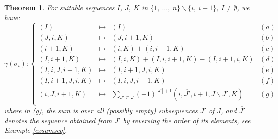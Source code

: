 \documentclass[11pt, a4paper, twoside,reqno]{amsart}
\newtheorem{thm}{Theorem}[section]
\begin{document}
\begin{thm}\label{thmcalculgamma}
For suitable sequences $I$, $J,\ K$ in $\{1,\ \ldots,\ n\}\backslash\{i,\ i+1\}$, $I\neq\emptyset$, we have:
  \[ \gamma(\sigma_i): \left \{ \begin{array}{llll}
    (I)   &\mapsto&  (I) &(a) \\
    
    (J,i,K)   &\mapsto&  (J,i+1,K) &(b)\\

    (i+1,K)   &\mapsto&  (i,K) + (i,i+1,K)&(c)\\
    (I,i+1,K)   &\mapsto&  (I,i,K) + (I,i,i+1,K) - (I,i+1,i,K) &(d)\\
    
    (I,i,J,i+1,K)   &\mapsto& (I,i+1,J,i,K)&(e)\\
    (I,i+1,J,i,K)   &\mapsto& (I,i,J,i+1,K)&(f)\\
    (i,J,i+1,K)   &\mapsto& \sum_{J'\subseteq J}(-1)^{|J'|+1}(i,\overline{J'},i+1,J\backslash J',K)&(g)\\
 \end{array}
 \right.
 \]
where in (g), the sum is over all (possibly empty) subsequences $J'$ of $J$, and $\overline{J'}$ denotes the sequence obtained from $J'$ by reversing the order of its elements, see Example \ref{exsumseq}.
\end{thm}
\end{document}
